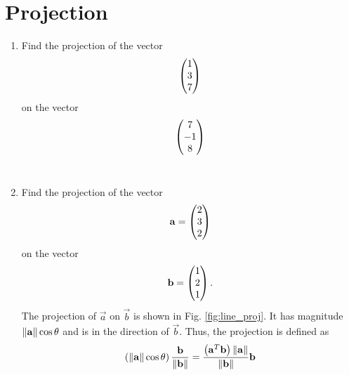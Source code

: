 \documentclass[journal,12pt,twocolumn]{IEEEtran}
\renewcommand\thesection{\arabic{section}}
\begin{document}
\section{Projection}
\renewcommand{\theequation}{\theenumi}
\begin{enumerate}[label=\thesection.\arabic*.,ref=\thesection.\theenumi]
\item Find the projection of the vector 
\begin{align}
\begin{pmatrix}1\\3\\7\end{pmatrix}
\end{align}
on the vector
\begin{align}
\begin{pmatrix}7\\-1\\8\end{pmatrix}
\end{align}
\\
\solution 
\item Find the projection of the vector 
\begin{align}
\mathbf{a} = \begin{pmatrix}2\\3\\2\end{pmatrix}
\end{align}
on the vector
\begin{align}
\mathbf{b}=\begin{pmatrix}1\\2\\1\end{pmatrix}.
\end{align}
%
\solution The projection of $\vec{a}$ on $\vec{b}$ is shown in Fig. \ref{fig:line_proj}. It has magnitude $\left\lVert\mathbf{a}\right\rVert\cos \theta$ and is in the direction of $\vec{b}$.
%
%
%
Thus, the projection is defined as 
\begin{align}
\left(\left\lVert\mathbf{a}\right\rVert\cos\theta\right) \frac{\mathbf{b}}{\left\lVert\mathbf{b}\right\rVert}
=  \frac{\left(\mathbf{a}^T\mathbf{b}\right)\left\lVert\mathbf{a}\right\rVert}{\left\lVert\mathbf{b}\right\rVert}\mathbf{b}
\end{align}
\end{enumerate}
\end{document}

